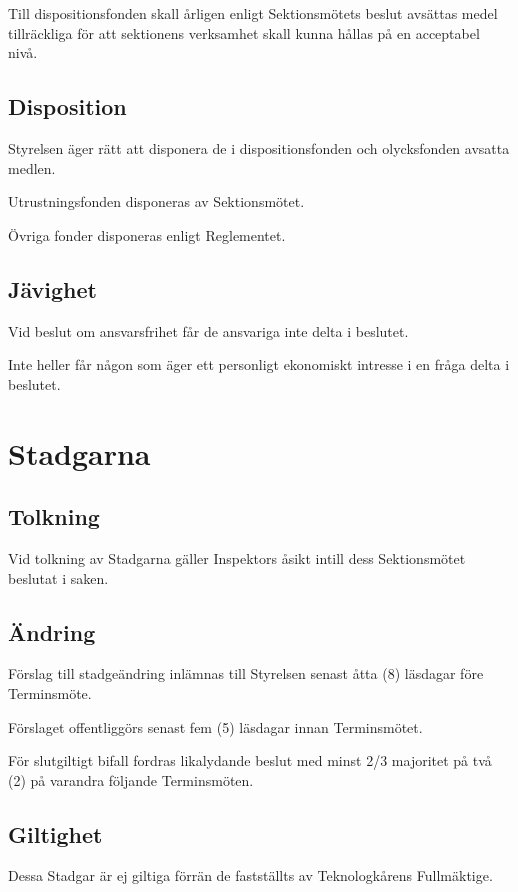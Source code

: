 \documentclass[10pt]{article}
\begin{document}
    Till dispositionsfonden skall årligen enligt Sektionsmötets beslut avsättas
    medel tillräckliga för att sektionens verksamhet skall kunna hållas på en
    acceptabel nivå.
    
    \subsection{Disposition}
    Styrelsen äger rätt att disponera de i dispositionsfonden och olycksfonden
    avsatta medlen.
    
    Utrustningsfonden disponeras av Sektionsmötet.
    
    Övriga fonder disponeras enligt Reglementet.
    
    \subsection{Jävighet}
    Vid beslut om ansvarsfrihet får de ansvariga inte delta i beslutet.
    
    Inte heller får någon som äger ett personligt ekonomiskt intresse i en
    fråga delta i beslutet.
    \newpage
    
    \section{Stadgarna}
    \subsection{Tolkning}
    Vid tolkning av Stadgarna gäller Inspektors åsikt intill dess Sektionsmötet
    beslutat i saken.
    
    \subsection{Ändring}
    Förslag till stadgeändring inlämnas till Styrelsen senast åtta (8) läsdagar
    före Terminsmöte.
    
    Förslaget offentliggörs senast fem (5) läsdagar innan Terminsmötet.
    
    För slutgiltigt bifall fordras likalydande beslut med minst 2/3 majoritet på
    två (2) på varandra följande Terminsmöten.
    
    \subsection{Giltighet}
    Dessa Stadgar är ej giltiga förrän de fastställts av Teknologkårens
    Fullmäktige.
    \newpage
    
\end{document}
